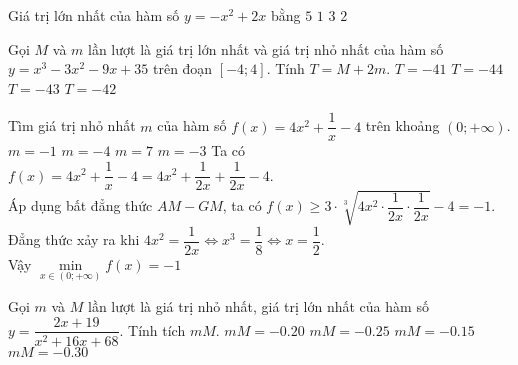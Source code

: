 \begin{ex}
 Giá trị lớn nhất của hàm số $y=-x^2+2x$ bằng
 \choice
 {$5$}
 {\True $1$}
 {$3$}
 {$2$}
\end{ex}
\begin{ex}%
 Gọi $M$ và $m$ lần lượt là giá trị lớn nhất và giá trị nhỏ nhất của hàm số $y=x^3-3x^2-9x+35$ trên đoạn $\left[ -4;4\right]$. Tính $T=M+2m$.
 \choice
 {$T=-41$}
 {$T=-44$}
 {$T=-43$}
 {\True $T=-42$}
\end{ex}
\begin{ex}%
 Tìm giá trị nhỏ nhất $m$ của hàm số $f(x)= 4x^2+\dfrac{1}{x}-4$ trên khoảng $(0;+\infty)$.
 \choice
 {\True $m=-1$}
 {$m=-4$}
 {$m=7$}
 {$m=-3$}
 \loigiai
 { Ta có $f(x)=4x^2+\dfrac{1}{x}-4 =4x^2+\dfrac{1}{2x}+\dfrac{1}{2x} -4.$\\
 Áp dụng bất đẳng thức $AM-GM$, ta có $f(x) \geq 3\cdot \sqrt[3]{4x^2 \cdot \dfrac{1}{2x}\cdot \dfrac{1}{2x}} -4 =-1$.
 Đẳng thức xảy ra khi $4x^2=\dfrac{1}{2x} \Leftrightarrow x^3=\dfrac{1}{8} \Leftrightarrow x=\dfrac{1}{2}$.\\
 Vậy $\min\limits_{x\in (0;+\infty)} f(x) =-1$
 }
\end{ex}
\begin{ex}
 Gọi $m$ và $M$ lần lượt là giá trị nhỏ nhất, giá trị lớn nhất của hàm số $y=\dfrac{2x+19}{x^2+16x+68}$. Tính tích $mM$.
 \choice
 {$mM=-0.20$}
 {\True $mM=-0.25$}
 {$mM=-0.15$}
 {$mM=-0.30$}
\end{ex}

